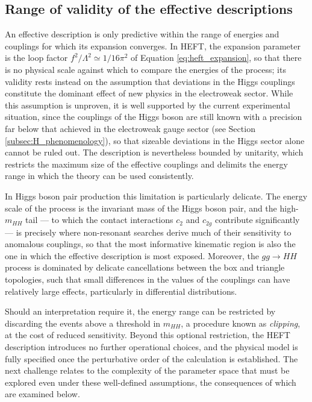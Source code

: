 \subsection{Range of validity of the effective descriptions}
\label{subsec:EFT_validity}
%
An effective description is only predictive within the range of energies and couplings for which its expansion converges. In HEFT, the expansion parameter is the loop factor $f^2/\Lambda^2\simeq1/16\pi^2$ of Equation \ref{eq:heft_expansion}, so that there is no physical scale against which to compare the energies of the process; its validity rests instead on the assumption that deviations in the Higgs couplings constitute the dominant effect of new physics in the electroweak sector. While this assumption is unproven, it is well supported by the current experimental situation, since the couplings of the Higgs boson are still known with a precision far below that achieved in the electroweak gauge sector (see Section \ref{subsec:H_phenomenology}), so that sizeable deviations in the Higgs sector alone cannot be ruled out. The description is nevertheless bounded by unitarity, which restricts the maximum size of the effective couplings and delimits the energy range in which the theory can be used consistently.

In Higgs boson pair production this limitation is particularly delicate. The energy scale of the process is the invariant mass of the Higgs boson pair, and the high-$m_{HH}$ tail — to which the contact interactions $c_2$ and $c_{2g}$ contribute significantly — is precisely where non-resonant searches derive much of their sensitivity to anomalous couplings, so that the most informative kinematic region is also the one in which the effective description is most exposed. Moreover, the $gg\to HH$ process is dominated by delicate cancellations between the box and triangle topologies, such that small differences in the values of the couplings can have relatively large effects, particularly in differential distributions.

Should an interpretation require it, the energy range can be restricted by discarding the events above a threshold in $m_{HH}$, a procedure known as \textit{clipping}, at the cost of reduced sensitivity. Beyond this optional restriction, the HEFT description introduces no further operational choices, and the physical model is fully specified once the perturbative order of the calculation is established. The next challenge relates to the complexity of the parameter space that must be explored even under these well-defined assumptions, the consequences of which are examined below.





